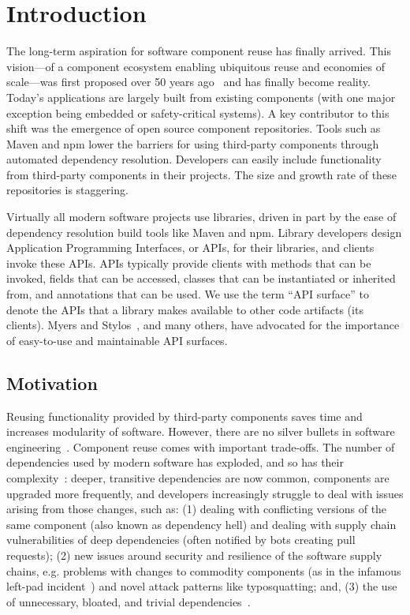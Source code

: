 \chapter{Introduction}
\label{sec:introduction}

The long-term aspiration for software component reuse has finally arrived. This vision---of a component ecosystem enabling ubiquitous reuse and economies of scale---was first proposed over 50 years ago~\cite{mcilroy1968mass} and has finally become reality. Today's applications are largely built from existing components (with one major exception being embedded or safety-critical systems). A key contributor to this shift was the emergence of open source component repositories. Tools such as Maven and npm lower the barriers for using third-party components through automated dependency resolution. Developers can easily include functionality from third-party components in their projects. The size and growth rate of these repositories is staggering. 

Virtually all modern software projects use libraries, driven in part by the ease of dependency resolution build tools like Maven and npm. Library developers design Application Programming Interfaces, or APIs, for their libraries, and clients invoke these APIs. APIs typically provide clients with methods that can be invoked, fields that can be accessed, classes that can be instantiated or inherited from, and annotations that can be used. We use the term ``API surface'' to denote the APIs that a library makes available to other code artifacts (its clients). Myers and Stylos~\cite{myers-cacm-2016}, and many others, have advocated for the importance of easy-to-use and maintainable API surfaces.


\section{Motivation}
\label{sec:motivation}

Reusing functionality provided by third-party components saves time and increases modularity of software. However, there are no silver bullets in software engineering~\cite{frederick87:_no_silver_bullet}. Component reuse comes with important trade-offs. The number of dependencies used by modern software has exploded, and so has their complexity~\cite{kikas2017structure,benelallam2019maven}: deeper, transitive dependencies are now common, components are upgraded more frequently, and developers increasingly struggle to deal with issues arising from those changes, such as: (1) dealing with conflicting versions of the same component (also known as dependency hell) and dealing with supply chain vulnerabilities of deep dependencies (often notified by bots creating pull requests); (2) new issues around security and resilience of the software supply chains, e.g. problems with changes to commodity components (as in the infamous left-pad incident~\cite{collins16:_how}) and novel attack patterns like typosquatting; and, (3) the use of unnecessary, bloated, and trivial dependencies~\cite{abdalkareem2017developers,soto2021comprehensive}.

